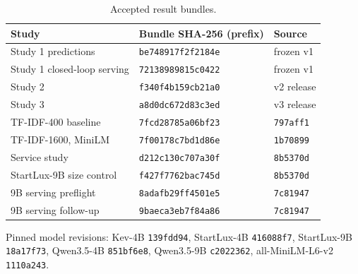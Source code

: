 \documentclass[11pt]{article}
\begin{document}
\begin{table}[h]
\centering
\scriptsize
\setlength{\tabcolsep}{2.5pt}
\begin{tabular}{lll}
\toprule
Study & Bundle SHA-256 (prefix) & Source \\
\midrule
Study 1 predictions & \texttt{be748917f2f2184e} & frozen v1 \\
Study 1 closed-loop serving & \texttt{72138989815c0422} & frozen v1 \\
Study 2 & \texttt{f340f4b159cb21a0} & v2 release \\
Study 3 & \texttt{a8d0dc672d83c3ed} & v3 release \\
TF-IDF-400 baseline & \texttt{7fcd28785a06bf23} & \texttt{797aff1} \\
TF-IDF-1600, MiniLM & \texttt{7f00178c7bd1d86e} & \texttt{1b70899} \\
Service study & \texttt{d212c130c707a30f} & \texttt{8b5370d} \\
StartLux-9B size control & \texttt{f427f7762bac745d} & \texttt{8b5370d} \\
9B serving preflight & \texttt{8adafb29ff4501e5} & \texttt{7c81947} \\
9B serving follow-up & \texttt{9baeca3eb7f84a86} & \texttt{7c81947} \\
\bottomrule
\end{tabular}
\caption{Accepted result bundles.}
\label{tab:bundles}
\end{table}

Pinned model revisions: Kev-4B \texttt{139fdd94}, StartLux-4B \texttt{416088f7}, StartLux-9B \texttt{18a17f73}, Qwen3.5-4B \texttt{851bf6e8}, Qwen3.5-9B \texttt{c2022362}, all-MiniLM-L6-v2 \texttt{1110a243}.
\end{document}
